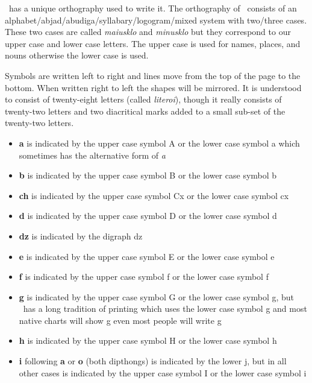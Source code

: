 \LanguageName\ has a unique orthography used to write it.
The orthography of \LanguageName\ consists of an alphabet/abjad/abudiga/syllabary/logogram/mixed system with two/three cases.
These two cases are called \textit{maiusklo} and \textit{minusklo} but they correspond to our upper case and lower case letters.
The upper case is used for names, places, and nouns otherwise the lower case is used.

Symbols are written left to right and lines move from the top of the page to the bottom.
When written right to left the shapes will be mirrored.
It is understood to consist of twenty-eight letters (called \emph{literoi}), though it really consists of twenty-two letters and two diacritical marks added to a small sub-set of the twenty-two letters.

\begin{itemize}
\item \textbf{a} is indicated by the upper case symbol {\confont A} or the lower case symbol {\confont a} which sometimes has the alternative form of \textsl{a}
\item \textbf{b}  is indicated by the upper case symbol {\confont B}  or the lower case symbol {\confont b}
\item \textbf{ch} is indicated by the upper case symbol {\confont Cx} or the lower case symbol {\confont cx}
\item \textbf{d}  is indicated by the upper case symbol {\confont D}  or the lower case symbol {\confont d}
\item \textbf{dz} is indicated by the digraph {\confont dz}
\item \textbf{e}  is indicated by the upper case symbol {\confont E}  or the lower case symbol {\confont e}
\item \textbf{f}  is indicated by the upper case symbol {\confont f}  or the lower case symbol {\confont f}
\item \textbf{g} is indicated by the upper case symbol {\confont G} or the lower case symbol \textsf{g}, but \LanguageName\ has a long tradition of printing which uses the lower case symbol {\confont g} and most native charts will show {\confont g} even most people will write \textsf{g}
\item \textbf{h}  is indicated by the upper case symbol {\confont H}  or the lower case symbol {\confont h}
\item \textbf{i} following \textbf{a} or \textbf{o} (both dipthongs) is indicated by the lower {\confont j}, but in all other cases is indicated by the upper case symbol {\confont I} or the lower case symbol {\confont i}

\end{itemize}
